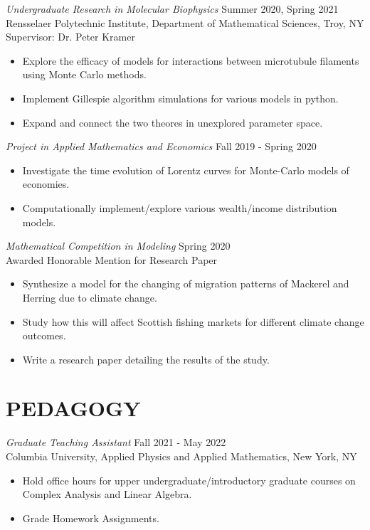 \documentclass[margin]{rpires}
\begin{document}
\begin{resume}
    {\sl Undergraduate Research in Molecular Biophysics} \hfill Summer 2020, Spring 2021 \\
    Rensselaer Polytechnic Institute, 
    Department of Mathematical Sciences, Troy, NY\\
    Supervisor: Dr. Peter Kramer
    \begin{itemize}  \itemsep -2pt %
    \item Explore the efficacy of models for interactions between microtubule filaments using Monte Carlo methods.
    \item Implement Gillespie algorithm simulations for various models in python. 
    \item Expand and connect the two theores in unexplored parameter space.
    \end{itemize}

    {\sl Project in Applied Mathematics and Economics} \hfill Fall 2019 - Spring 2020
    \begin{itemize}  \itemsep -2pt %
        \item Investigate the time evolution of Lorentz curves for Monte-Carlo models of economies.
        \item Computationally implement/explore various wealth/income distribution models.
    \end{itemize}

    {\sl Mathematical Competition in Modeling} \hfill Spring 2020 \\
    Awarded Honorable Mention for Research Paper
    \begin{itemize}  \itemsep -2pt %
        \item Synthesize a model for the changing of migration patterns of Mackerel and Herring due to climate change.
        \item Study how this will affect Scottish fishing markets for different climate change outcomes.
        \item Write a research paper detailing the results of the study.
    \end{itemize}

\section{PEDAGOGY}
    {\sl Graduate Teaching Assistant} \hfill Fall 2021 - May 2022 \\
    Columbia University, Applied Physics and Applied Mathematics, New York, NY
    \begin{itemize}  \itemsep -2pt %
        \item Hold office hours for upper undergraduate/introductory graduate courses on Complex Analysis and Linear Algebra.
        \item Grade Homework Assignments. 
    \end{itemize}    



\end{resume}
\end{document}
